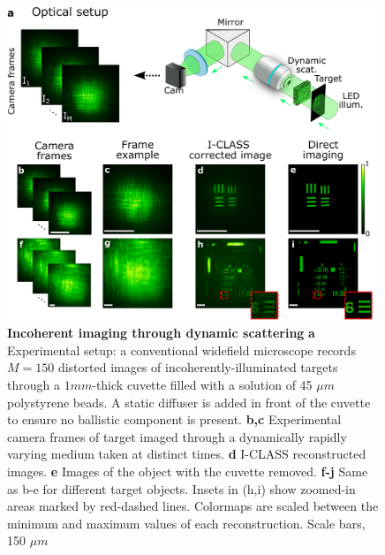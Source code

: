 \documentclass[pdflatex,sn-mathphys-num]{sn-jnl}%
\theoremstyle{thmstyleone}%
\theoremstyle{thmstyletwo}%
\theoremstyle{thmstylethree}%
\begin{document}
\begin{figure}[b!]
	\centering
	\includegraphics [width=0.99\textwidth,]
	{figures/figure_3.pdf}
    \caption{\textbf{Incoherent imaging through dynamic scattering}
       \textbf{a} Experimental setup: a conventional widefield microscope records $M=150$ distorted images of incoherently-illuminated targets through a $1mm$-thick cuvette filled with a solution of 45 $\mu m$ polystyrene beads. A static diffuser is added in front of the cuvette to ensure no ballistic component is present. 
    \textbf{b,c} Experimental camera frames of target imaged through a dynamically rapidly varying medium taken at distinct times. \textbf{d}  I-CLASS reconstructed images. \textbf{e} Images of the object with the cuvette removed.
    \textbf{f-j} Same as b-e for different target objects.
    Insets in (h,i) show zoomed-in areas marked by red-dashed lines. Colormaps are scaled between the minimum and maximum values of each reconstruction. Scale bars, 150 $\mu m$}
    \label{fig3}
    \end{figure} 
\end{document}
